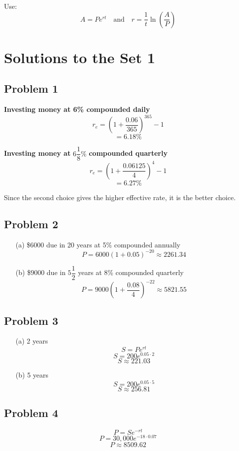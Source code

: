 \documentclass[12pt]{article}
\begin{document}
Use:
\[
A = Pe^{rt}
\quad \text{and} \quad r = \frac{1}{t} \ln\left(\frac{A}{P}\right)
\]


\newpage
\section*{Solutions to the Set 1}
\subsection*{Problem 1}
\textbf{Investing money at 6\% compounded daily}
\[
r_e = \left(1 + \frac{0.06}{365}\right)^{365} - 1
\]
\[
= 6.18\%
\]

\textbf{Investing money at } \( 6\dfrac{1}{8}\%\) \textbf{ compounded quarterly}
\[
r_e = \left(1 + \frac{0.06125}{4} \right)^4 - 1
\]
\[
= 6.27\%
\]

Since the second choice gives the higher effective rate, it is the better choice.
\subsection*{Problem 2}

\begin{itemize}
    \item[(a)] \$6000 due in 20 years at 5\% compounded annually
    \[
    P = 6000(1 + 0.05)^{-20} \approx \boxed{2261.34}
    \]

    \item[(b)] \$9000 due in \(5\dfrac{1}{2}\) years at 8\% compounded quarterly
    \[
    P = 9000 \left(1 + \frac{0.08}{4} \right)^{-22} \approx  \boxed{5821.55}
    \]
\end{itemize}
\subsection*{Problem 3}

\begin{itemize}
    \item[(a)] 2 years
    \[
    S = Pe^{rt}
    \]
    \[
    S = 200e^{0.05 \cdot 2}
    \]
    \[
    S \approx \boxed{221.03}
    \]

    \item[(b)] 5 years
    \[
    S = 200e^{0.05 \cdot 5}
    \]
    \[
    S \approx \boxed{256.81}
    \]
\end{itemize}
\subsection*{Problem 4}

\[
P = Se^{-rt}
\]
\[
P = 30{,}000e^{-18 \cdot 0.07}
\]
\[
P \approx \boxed{8509.62}
\]
\end{document}
